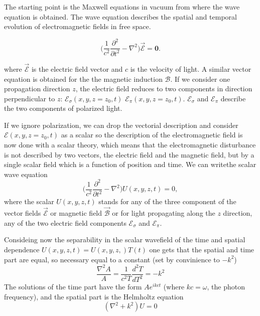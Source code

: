 \documentclass{iucr}              %
\begin{document}
The starting point is the Maxwell equations in vacuum from where the wave equation is obtained. The wave equation describes the spatial and temporal evolution of electromagnetic fields in free space. 

\begin{equation}\label{eq: d'Alembert electric field}
	\Big( \frac{1}{c^2} \frac{\partial^2}{\partial t^2}-\nabla^2\Big) \vec{\mathcal{E}} = \bm{0}.
\end{equation}


where $\vec{\mathcal{E}}$ is the electric field vector and $c$ is the velocity of light. A similar vector equation is obtained for the the magnetic induction $\mathcal{B}$. If we consider one propagation direction $z$, the electric field reduces to two components in direction perpendicular to $z$: $\mathcal{E}_\sigma(x,y,z=z_0,t)$ $\mathcal{E}_\pi(x,y,z=z_0,t)$. $\mathcal{E}_\sigma$ and $\mathcal{E}_\pi$ describe the two components of polarized light. 

If we ignore polarization, we can drop the vectorial description and consider $\mathcal{E}(x,y,z=z_0,t)$ as a scalar so the description of the electromagnetic field is now done with a scalar theory, which means that the electromagnetic disturbance is not described by two vectors, the electric field and the magnetic field, but by a single scalar field which is a function of position and time. We can writethe scalar wave equation
\begin{equation}\label{eq: d'Alembert scalar field}
\Big(\frac{1}{c^2} \frac{\partial^2}{\partial t^2}-\nabla^2\Big) U(x,y,z,t) = 0,
\end{equation}
where the scalar $U(x,y,z,t)$ stands for any of the three component of the vector fields $\vec{\mathcal{E}}$ or magnetic field $\vec{\mathcal{B}}$ or for light propagating along the $z$ direction, any of the two electric field components $\mathcal{E}_\sigma$ and $\mathcal{E}_\pi$. 

Consideing now the separability in the scalar wavefield of the time and spatial dependence $U(x,y,z,t)=U(x,y,z,)T(t)$ one gets that the spatial and time part are equal, so necessary equal to a constant (set by convinience to $-k^2$)
\begin{equation}
\frac{\nabla^2 A}{A}=\frac{1}{c^2 T} \frac{d^2 T}{dT^2} = -k^2
\end{equation}
The solutions of the time part have the form $ A e^{i k c t}$ (where $k c = \omega$, the photon frequency), and the spatial part is the Helmholtz equation
\begin{equation}\label{eq: Helmholtz equation}
(\nabla^2 + k^2) U = 0
\end{equation}
\end{document}
